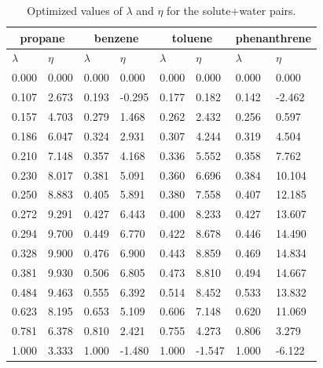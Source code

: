 \begin{table}[h]
	\centering
	\caption{Optimized values of $\lambda $ and $\eta $ for the solute+water pairs. }
	\label{tbl:lambdawater}
	\begin{tabular}{llllllll}
		\hline\hline
		\multicolumn{2}{c}{propane}& \multicolumn{2}{c}{benzene}& \multicolumn{2}{c}{toluene}& \multicolumn{2}{c}{phenanthrene}\\
		\hline\hline
		$\lambda$ & $\eta$ & $\lambda$ & $\eta$  & $\lambda$ & $\eta$  & $\lambda$ & $\eta$ \\ 
		\hline\hline
		0.000	&	0.000	&	0.000	&	0.000	&	0.000	&	0.000	&	0.000	&	0.000	\\
		0.107	&	2.673	&	0.193	&	-0.295	&	0.177	&	0.182	&	0.142	&	-2.462	\\
		0.157	&	4.703	&	0.279	&	1.468	&	0.262	&	2.432	&	0.256	&	0.597	\\
		0.186	&	6.047	&	0.324	&	2.931	&	0.307	&	4.244	&	0.319	&	4.504	\\
		0.210	&	7.148	&	0.357	&	4.168	&	0.336	&	5.552	&	0.358	&	7.762	\\
		0.230	&	8.017	&	0.381	&	5.091	&	0.360	&	6.696	&	0.384	&	10.104	\\
		0.250	&	8.883	&	0.405	&	5.891	&	0.380	&	7.558	&	0.407	&	12.185	\\
		0.272	&	9.291	&	0.427	&	6.443	&	0.400	&	8.233	&	0.427	&	13.607	\\
		0.294	&	9.700	&	0.449	&	6.770	&	0.422	&	8.678	&	0.446	&	14.490	\\
		0.328	&	9.900	&	0.476	&	6.900	&	0.443	&	8.859	&	0.469	&	14.834	\\
		0.381	&	9.930	&	0.506	&	6.805	&	0.473	&	8.810	&	0.494	&	14.667	\\
		0.484	&	9.463	&	0.555	&	6.392	&	0.514	&	8.452	&	0.533	&	13.832	\\
		0.623	&	8.195	&	0.653	&	5.109	&	0.606	&	7.148	&	0.620	&	11.069	\\
		0.781	&	6.378	&	0.810	&	2.421	&	0.755	&	4.273	&	0.806	&	3.279	\\
		1.000	&	3.333	&	1.000	&	-1.480	&	1.000	&	-1.547	&	1.000	&	-6.122	\\
		
		
		\hline\hline
	\end{tabular}
\end{table}

